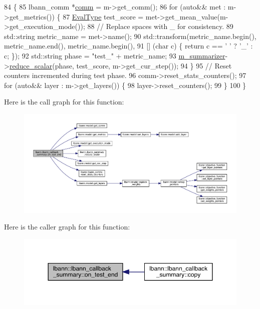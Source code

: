 \begin{DoxyCode}
84                                                  \{
85   lbann\_comm *\hyperlink{file__io_8cpp_ab048c6f9fcbcfaa57ce68b00263dbebe}{comm} = m->get\_comm();
86   \textcolor{keywordflow}{for} (\textcolor{keyword}{auto}&& met : m->get\_metrics()) \{
87     \hyperlink{base_8hpp_a3266f5ac18504bbadea983c109566867}{EvalType} test\_score = met->get\_mean\_value(m->get\_execution\_mode());
88     \textcolor{comment}{// Replace spaces with \_ for consistency.}
89     std::string metric\_name = met->name();
90     std::transform(metric\_name.begin(), metric\_name.end(), metric\_name.begin(),
91                    [] (\textcolor{keywordtype}{char} c) \{ \textcolor{keywordflow}{return} c == \textcolor{charliteral}{' '} ? \textcolor{charliteral}{'\_'} : c; \});
92     std::string phase = \textcolor{stringliteral}{"test\_"} + metric\_name;
93     \hyperlink{classlbann_1_1lbann__callback_a277d46138184f85f161a8263b8322c76}{m\_summarizer}->\hyperlink{classlbann_1_1lbann__summary_a3e0b9aae1f80403a195567fd25ea2525}{reduce\_scalar}(phase, test\_score, m->get\_cur\_step());
94   \}
95   \textcolor{comment}{// Reset counters incremented during test phase.}
96   comm->reset\_stats\_counters();
97   \textcolor{keywordflow}{for} (\textcolor{keyword}{auto}&& layer : m->get\_layers()) \{
98     layer->reset\_counters();
99   \}
100 \}
\end{DoxyCode}
Here is the call graph for this function\+:\nopagebreak
\begin{figure}[H]
\begin{center}
\leavevmode
\includegraphics[width=350pt]{classlbann_1_1lbann__callback__summary_a8dced0a202df3daaece138a7b958e544_cgraph}
\end{center}
\end{figure}
Here is the caller graph for this function\+:\nopagebreak
\begin{figure}[H]
\begin{center}
\leavevmode
\includegraphics[width=350pt]{classlbann_1_1lbann__callback__summary_a8dced0a202df3daaece138a7b958e544_icgraph}
\end{center}
\end{figure}
